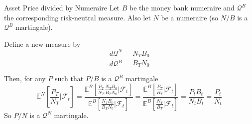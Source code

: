 \documentclass{beamer}
\begin{document}
\begin{frame}{Asset Price divided by Numeraire}
Let $B$ be the money bank numeraire and $\mathcal{Q}^B$ the corresponding risk-neutral measure. Also let $N$ be a numeraire (so $N/B$ is a $\mathcal{Q}^B$ martingale). 

Define a new measure by
\begin{equation*}
	\frac{d\mathcal{Q}^N}{d\mathcal{Q}^B} = \frac{N_TB_0}{B_TN_0}
\end{equation*}

Then, for any $P$ such that $P/B$ is a $\mathcal{Q}^B$ martingale
\begin{equation*}
\mathbb{E}^N\left[\frac{P_T}{N_T}\bigg|\mathcal{F}_t\right] = \frac{\mathbb{E}^B\left[\frac{P_T}{N_T}\frac{N_TB_0}{B_TN_0}\bigg|\mathcal{F}_t\right]}{\mathbb{E}^B\left[\frac{N_TB_0}{B_TN_0}\bigg|\mathcal{F}_t\right]}
=\frac{\mathbb{E}^B\left[\frac{P_T}{B_T}\bigg|\mathcal{F}_t\right]}
{\mathbb{E}^B\left[\frac{N_T}{B_T}\bigg|\mathcal{F}_t\right]}
=\frac{P_tB_t}{N_tB_t}=\frac{P_t}{N_t}
\end{equation*}
So $P/N$ is a $\mathcal{Q}^N$ martingale.
\end{frame}

%
\end{document}
